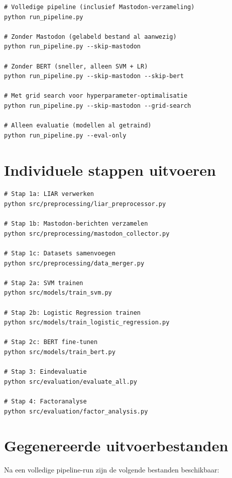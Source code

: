 \begin{verbatim}
# Volledige pipeline (inclusief Mastodon-verzameling)
python run_pipeline.py

# Zonder Mastodon (gelabeld bestand al aanwezig)
python run_pipeline.py --skip-mastodon

# Zonder BERT (sneller, alleen SVM + LR)
python run_pipeline.py --skip-mastodon --skip-bert

# Met grid search voor hyperparameter-optimalisatie
python run_pipeline.py --skip-mastodon --grid-search

# Alleen evaluatie (modellen al getraind)
python run_pipeline.py --eval-only
\end{verbatim}

\section{Individuele stappen uitvoeren}

\begin{verbatim}
# Stap 1a: LIAR verwerken
python src/preprocessing/liar_preprocessor.py

# Stap 1b: Mastodon-berichten verzamelen
python src/preprocessing/mastodon_collector.py

# Stap 1c: Datasets samenvoegen
python src/preprocessing/data_merger.py

# Stap 2a: SVM trainen
python src/models/train_svm.py

# Stap 2b: Logistic Regression trainen
python src/models/train_logistic_regression.py

# Stap 2c: BERT fine-tunen
python src/models/train_bert.py

# Stap 3: Eindevaluatie
python src/evaluation/evaluate_all.py

# Stap 4: Factoranalyse
python src/evaluation/factor_analysis.py
\end{verbatim}

\section{Gegenereerde uitvoerbestanden}

Na een volledige pipeline-run zijn de volgende bestanden beschikbaar:

